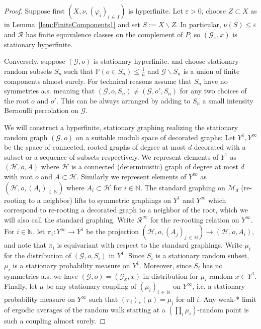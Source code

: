 \documentclass[10pt]{amsart}
\theoremstyle{definition}\newtheorem{defi}[theo]{Definition}\newtheorem{rema}[theo]{Remark}\newtheorem{exam}[theo]{Example}\newtheorem{exem}[theo]{Example}\newtheorem{nota}[theo]{Notation}
\newcommand{\bbN}{\mathbb{N}}
\newcommand{\bbP}{\mathbb{P}}
\newcommand{\calR}{\mathcal{R}}
\newcommand{\calH}{\mathcal{H}}
\newcommand{\calM}{\mathcal{M}}
\newcommand{\calG}{\mathcal{G}}
\begin{document}
\begin{proof}
Suppose first $(X,\nu,(\varphi_i)_{i\,\in\,I})$ is hyperfinite. Let $\varepsilon>0$, choose $Z\subset X$ as in Lemma~\ref{lem:FiniteComponents1} and set $S:=X\backslash Z$. In particular, $\nu(S)\leq \varepsilon$ and $\calR$ has finite equivalence classes on the complement of $P$, so $(\calG_x, x)$ is stationary hyperfinite.

Conversely, suppose $(\calG,o)$ is stationary hyperfinite. and choose stationary random subsets $S_n$ such that $\bbP(o\in S_n)\leq \frac{1}{n}$ and $\calG \backslash S_n$ is a union of finite components almost surely. For technical reasons assume that $S_n$ have no symmetries a.s. meaning that $(\calG,o,S_n)\neq (\calG,o',S_n)$ for any two choices of the root $o$ and $o'$. This can be always arranged by adding to $S_n$ a small intensity Bernoulli percolation on $\calG$.

We will construct a hyperfinite, stationary graphing realizing the stationary random graph $(\calG, o)$ on a suitable moduli space of decorated graphs: Let $Y^1,Y^\infty$ be the space of connected, rooted graphs of degree at most $d$ decorated with a subset or a sequence of subsets respectively. We represent elements of $Y^1$ as $(\calH,o,A)$ where $\calH$ is a connected (deterministic) graph of degree at most $d$ with root $o$ and $A\subset \calH$. Similarly we represent elements of $Y^\infty$ as $(\calH,o,(A_i)_{\in\,\bbN})$ where $A_i\subset \calH$ for $i\in\bbN$. The standard graphing on $\calM_d$ (re-rooting to a neighbor) lifts to symmetric graphings on $Y^1$ and $Y^\infty$ which correspond to re-rooting a decorated graph to a neighbor of the root, which we will also call the standard graphing. Write $\calR^\infty$ for the re-rooting relation on $Y^\infty$. For $i\in\bbN$, let $\pi_i\colon Y^\infty\to Y^1$ be the projection $(\calH,o,(A_j)_{j\,\in\,\bbN})\mapsto (\calH,o,A_i)$, and note that $\pi_i$ is equivariant with respect to the standard graphings. Write $\mu_i$ for the distribution of $(\calG,o, S_i)$ in $Y^1$. Since $S_i$ is a stationary random subset, $\mu_i$ is a stationary probability measure on $Y^1$. Moreover, since $S_i$ has no symmetries a.s. we have $(\calG,o)=(\calG_x,x)$ in distribution for $\mu_i$-random $x\in Y^1$. Finally, let $\mu$ be any stationary coupling of $(\mu_i)_{i\,\in\,\bbN}$ on $Y^\infty$, i.e. a stationary probability measure on $Y^\infty$ such that $(\pi_i)_*(\mu)=\mu_i$ for all $i$. Any weak-* limit of ergodic averages of the random walk starting at a $(\prod_i \mu_i)$-random point is such a coupling almost surely.


\end{proof}
\end{document}
